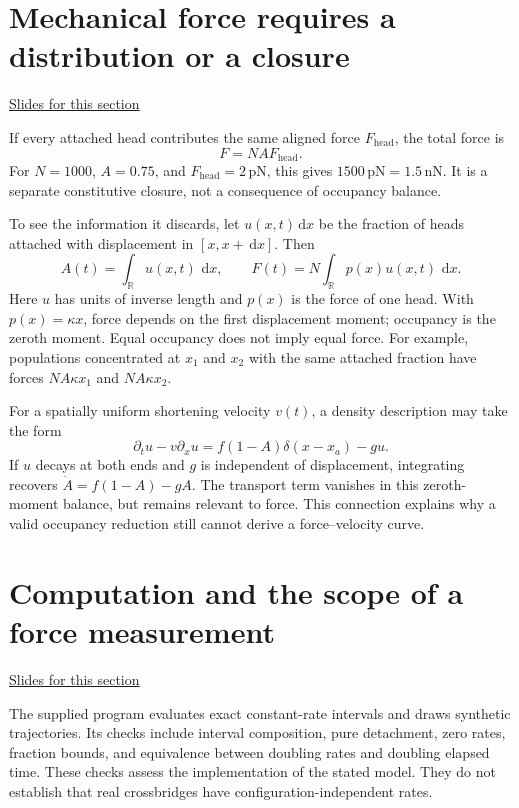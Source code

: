 \documentclass[11pt,letterpaper]{article}
\providecommand{\dd}{\,\mathrm{d}}\providecommand{\R}{\mathbb{R}}
\theoremstyle{definition}\newtheorem{definition}{Definition}\newtheorem{example}{Example}
\numberwithin{equation}{section}
\begin{document}
\section{Mechanical force requires a distribution or a closure}
\hypertarget{note-mechanical-force-requires-a-distribution-or-a-closure}{}\label{note:mechanical-force-requires-a-distribution-or-a-closure}
{\small \href{slides.html\#frame=a-fixed-force-closure\&step=1}{Slides for this section}}\par
If every attached head contributes the same aligned force $F_{\mathrm{head}}$, the total force is
\[
F=N A F_{\mathrm{head}}.
\]
For $N=1000$, $A=0.75$, and $F_{\mathrm{head}}=2\,\mathrm{pN}$, this gives $1500\,\mathrm{pN}=1.5\,\mathrm{nN}$. It is a separate constitutive closure, not a consequence of occupancy balance.

To see the information it discards, let $u(x,t)\dd x$ be the fraction of heads attached with displacement in $[x,x+\dd x]$. Then
\[
A(t)=\int_{\R}u(x,t)\,\dd x,\qquad
F(t)=N\int_{\R}p(x)u(x,t)\,\dd x.
\]
Here $u$ has units of inverse length and $p(x)$ is the force of one head. With $p(x)=\kappa x$, force depends on the first displacement moment; occupancy is the zeroth moment. Equal occupancy does not imply equal force. For example, populations concentrated at $x_1$ and $x_2$ with the same attached fraction have forces $NA\kappa x_1$ and $NA\kappa x_2$.

For a spatially uniform shortening velocity $v(t)$, a density description may take the form
\[
\partial_tu-v\partial_xu=f(1-A)\delta(x-x_a)-g u.
\]
If $u$ decays at both ends and $g$ is independent of displacement, integrating recovers $\dot A=f(1-A)-gA$. The transport term vanishes in this zeroth-moment balance, but remains relevant to force. This connection explains why a valid occupancy reduction still cannot derive a force--velocity curve.
\section{Computation and the scope of a force measurement}
\hypertarget{note-computation-and-the-scope-of-a-force-measurement}{}\label{note:computation-and-the-scope-of-a-force-measurement}
{\small \href{slides.html\#frame=rate-experiments-in-the-companion\&step=1}{Slides for this section}}\par
The supplied program evaluates exact constant-rate intervals and draws synthetic trajectories. Its checks include interval composition, pure detachment, zero rates, fraction bounds, and equivalence between doubling rates and doubling elapsed time. These checks assess the implementation of the stated model. They do not establish that real crossbridges have configuration-independent rates.
\end{document}
